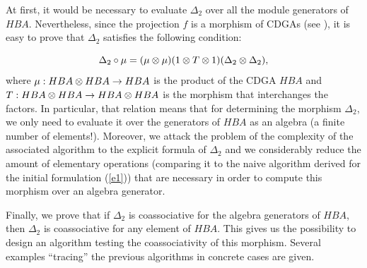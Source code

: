      At first, it would be  necessary to evaluate $\Delta_2$ over all the
module generators of $HBA$. Nevertheless, since the
projection $f$ is a morphism of CDGAs (see \cite{HCDGA}), it is
easy to prove that $\Delta_2$ satisfies the following condition:

$$ \Delta_2 \circ \mu = (\mu \otimes \mu)(1\otimes T\otimes 1) (\Delta_2 \otimes \Delta_2),$$
where $\mu: HBA\otimes HBA \rightarrow HBA$ is the product of the CDGA
$HBA$ and $T:HBA \otimes HBA \rightarrow HBA\otimes HBA$ is the morphism
that interchanges the factors. In particular, that relation means that for
determining the morphism $\Delta_2$, we
only need to evaluate it over the generators of $HBA$ as an
algebra (a finite number of elements!). Moreover, we attack the
problem of
the complexity of the associated algorithm to the explicit
formula of $\Delta_2$ and we considerably reduce the amount of
elementary operations (comparing it to the naive algorithm derived for
the initial formulation (\ref{e1})) that are necessary in order to
compute this
morphism over an algebra generator.



    Finally, we prove that if $\Delta_2$ is coassociative for the
    algebra generators of $HBA$, then $\Delta_2$ is coassociative
    for any element of $HBA$. This gives us the possibility to
    design an algorithm testing the coassociativity of this
    morphism. Several examples ``tracing''
    the previous algorithms in
    concrete cases are given.

